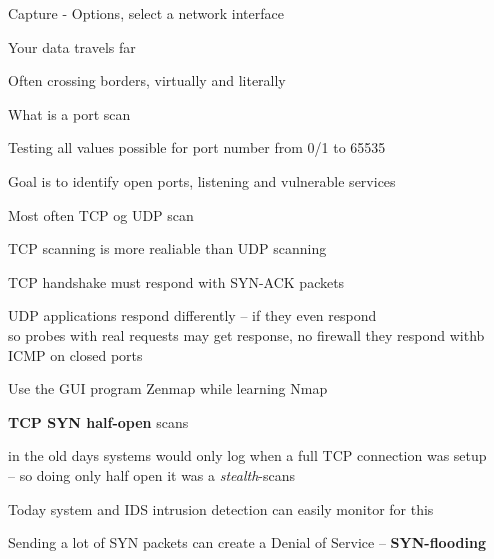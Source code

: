 \documentclass[Screen16to9,17pt]{foils}
\begin{document}


\centerline{Capture - Options, select a network interface}
\centerline{}




\begin{list2}
\item Your data travels far
\item Often crossing borders, virtually and literally
\end{list2}



\begin{list1}
\item What is a port scan
\item Testing all values possible for port number from 0/1 to 65535
\item Goal is to identify open ports, listening and vulnerable services
\item Most often TCP og UDP scan
\item TCP scanning is more realiable than UDP scanning
\item TCP handshake must respond with SYN-ACK packets
\item UDP applications respond differently -- if they even respond\\
so probes with real requests may get response, no firewall they respond withb ICMP on closed ports
\item Use the GUI program Zenmap while learning Nmap
\end{list1}



\begin{list2}
\item {\bfseries TCP SYN half-open} scans
\item in the old days systems would only log when a full TCP connection was setup\\
  -- so doing only half open it was a \emph{stealth}-scans
\item Today system and IDS intrusion detection can easily monitor for this
\item Sending a lot of SYN packets can create a Denial of Service -- {\bfseries SYN-flooding}
\end{list2}
\end{document}
